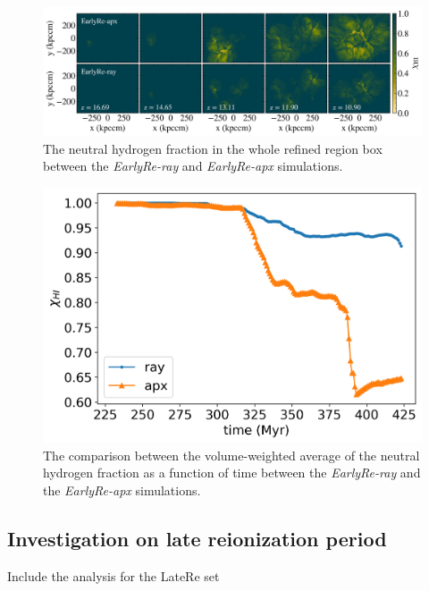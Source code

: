 \documentclass[linenumbers, twocolumn]{aastex631}
\begin{document}
\begin{figure}
    \centering
    \includegraphics[width=\textwidth]{EarlyRe/neutralHfraction_comparison_multiple.png}
    \caption{The neutral hydrogen fraction in the whole refined region box between the \textit{EarlyRe-ray} and \textit{EarlyRe-apx} simulations.}
    \label{fig:neutralHfrac_map}
\end{figure}

\begin{figure}
    \centering
    \includegraphics[width=0.95\columnwidth]{EarlyRe/neutralHfraction_evolution.png}
    \caption{The comparison between the volume-weighted average of the neutral hydrogen fraction as a function of time between the \textit{EarlyRe-ray} and the \textit{EarlyRe-apx} simulations.}
    \label{fig:neutralHfrac_evolution}
\end{figure}


\subsection{Investigation on late reionization period}
Include the analysis for the LateRe set

\end{document}
